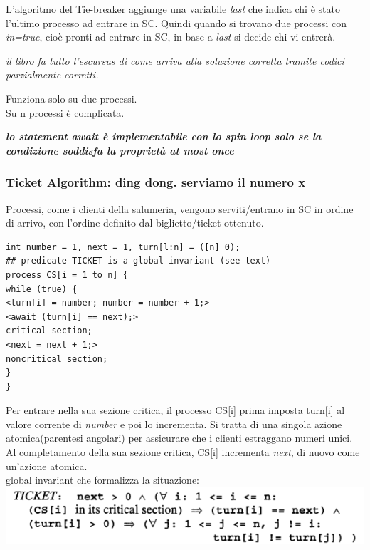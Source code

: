 \documentclass[10pt,a4paper]{article}
\begin{document}
L'algoritmo del Tie-breaker aggiunge una variabile \textit{last} che indica chi è stato l'ultimo processo ad entrare in SC. Quindi quando si trovano due processi con \textit{in=true}, cioè pronti ad entrare in SC, in base a \textit{last} si decide chi vi entrerà.

\textit{il libro fa tutto l'escursus di come arriva alla soluzione corretta tramite codici parzialmente corretti.}

Funziona solo su due processi.\\
Su n processi è complicata.


\textbf{\textit{lo statement await è implementabile con lo spin loop solo se la condizione soddisfa la proprietà at most once}}\\


\subsubsection{Ticket Algorithm: ding dong. serviamo il numero x}
Processi, come i clienti della salumeria, vengono serviti/entrano in SC in ordine di arrivo, con l'ordine definito dal biglietto/ticket ottenuto.
\begin{verbatim}
int number = 1, next = 1, turn[l:n] = ([n] 0);
## predicate TICKET is a global invariant (see text)
process CS[i = 1 to n] {
while (true) {
<turn[i] = number; number = number + 1;>
<await (turn[i] == next);>
critical section;
<next = next + 1;>
noncritical section;
}
}
\end{verbatim}

Per entrare nella sua sezione critica, il processo CS[i] prima imposta turn[i] al valore corrente di \textit{number} e poi lo incrementa. Si tratta di una singola azione atomica(parentesi angolari) per assicurare che i clienti estraggano numeri unici. Al completamento della sua sezione critica, CS[i] incrementa \textit{next}, di nuovo come un'azione atomica.\\
global invariant che formalizza la situazione:\\
\includegraphics[scale=0.4]{img/ticket.png} \\
\end{document}
